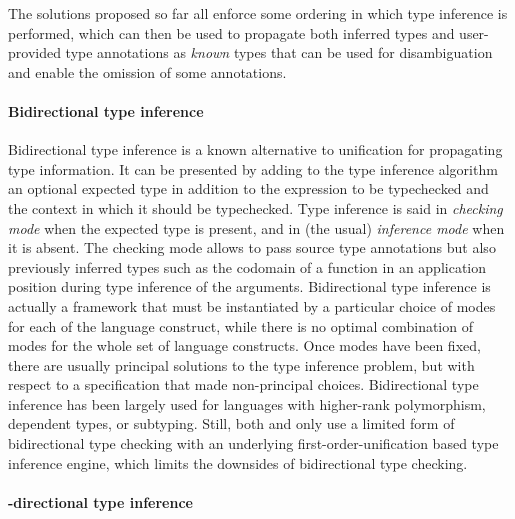 \documentclass[acmsmall,screen,nonacm]{acmart}
\begin{document}
The solutions proposed so far all enforce some ordering in which type
inference is performed, which can then be used to propagate both inferred
types and user-provided type annotations as \emph{known} types that can be
used for disambiguation and enable the omission of some annotations.

\paragraph{Bidirectional type inference}

Bidirectional type inference is a known alternative to unification for
propagating type information. It can be presented by adding to the type
inference algorithm an optional expected type in addition to the expression
to be typechecked and the context in which it should be typechecked.  Type
inference is said in \emph{checking mode} when the expected type is present,
and in (the usual) \emph{inference mode} when it is absent. The checking
mode allows to pass source type annotations but also previously inferred
types such as the codomain of a function in an application position during
type inference of the arguments.
%
Bidirectional type inference is actually a framework that must be
instantiated by a particular choice of modes for each of the language
construct, while there is no optimal combination of modes for the whole set
of language constructs. Once modes have been fixed, there are usually
principal solutions to the type inference problem, but with respect to a
specification that made non-principal choices.
%
Bidirectional type inference has been largely used for languages with
higher-rank polymorphism, dependent types, or subtyping.  Still, both \OCaml
and \Haskell only use a limited form of bidirectional type checking with an
underlying first-order-unification based type inference engine, which limits
the downsides of bidirectional type checking.


\paragraph{\Geninst-directional type inference}

 
\end{document}
